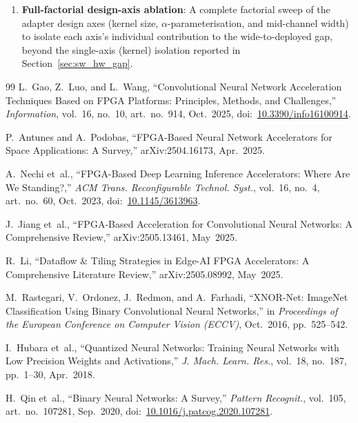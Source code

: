 \documentclass[12pt, a4paper]{report}
\numberwithin{equation}{chapter}
\numberwithin{figure}{chapter}
\numberwithin{table}{chapter}
\numberwithin{algorithm}{chapter}
\begin{document}
\begin{enumerate}
    \item \textbf{Full-factorial design-axis ablation}: A complete factorial sweep of the adapter design axes (kernel size, $\alpha$-parameterisation, and mid-channel width) to isolate each axis's individual contribution to the wide-to-deployed gap, beyond the single-axis (kernel) isolation reported in Section~\ref{sec:sw_hw_gap}.
\end{enumerate}

\begin{thebibliography}{99}
L.~Gao, Z.~Luo, and L.~Wang,
``Convolutional Neural Network Acceleration Techniques Based on FPGA Platforms: Principles, Methods, and Challenges,''
\emph{Information}, vol.~16, no.~10, art.~no.~914, Oct.~2025,
doi:~\url{10.3390/info16100914}.

P.~Antunes and A.~Podobas,
``FPGA-Based Neural Network Accelerators for Space Applications: A Survey,''
arXiv:2504.16173, Apr.~2025.

A.~Nechi et~al.,
``FPGA-Based Deep Learning Inference Accelerators: Where Are We Standing?,''
\emph{ACM Trans. Reconfigurable Technol. Syst.}, vol.~16, no.~4, art.~no.~60, Oct.~2023,
doi:~\url{10.1145/3613963}.

J.~Jiang et~al.,
``FPGA-Based Acceleration for Convolutional Neural Networks: A Comprehensive Review,''
arXiv:2505.13461, May~2025.

R.~Li,
``Dataflow \& Tiling Strategies in Edge-AI FPGA Accelerators: A Comprehensive Literature Review,''
arXiv:2505.08992, May~2025.

M.~Rastegari, V.~Ordonez, J.~Redmon, and A.~Farhadi,
``XNOR-Net: ImageNet Classification Using Binary Convolutional Neural Networks,''
in \emph{Proceedings of the European Conference on Computer Vision (ECCV)}, Oct.~2016, pp.~525--542.

I.~Hubara et~al.,
``Quantized Neural Networks: Training Neural Networks with Low Precision Weights and Activations,''
\emph{J. Mach. Learn. Res.}, vol.~18, no.~187, pp.~1--30, Apr.~2018.

H.~Qin et~al.,
``Binary Neural Networks: A Survey,''
\emph{Pattern Recognit.}, vol.~105, art.~no.~107281, Sep.~2020,
doi:~\url{10.1016/j.patcog.2020.107281}.


\end{thebibliography}
\end{document}
